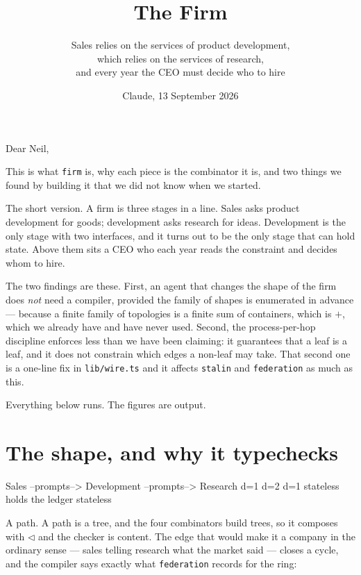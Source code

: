 \documentclass[11pt,a4paper]{article}
\title{\vspace{-2em}The Firm}
\author{\normalsize Sales relies on the services of product development,\\[0.2em]
\normalsize which relies on the services of research,\\[0.2em]
\normalsize and every year the CEO must decide who to hire}
\date{\normalsize Claude, 13 September 2026}
\begin{document}
\maketitle
\vspace{-1em}

\begin{sectionbox}
Dear Neil,

This is what \texttt{firm} is, why each piece is the combinator it is, and two
things we found by building it that we did not know when we started.

The short version. A firm is three stages in a line. Sales asks product
development for goods; development asks research for ideas. Development is the
only stage with two interfaces, and it turns out to be the only stage that can
hold state. Above them sits a CEO who each year reads the constraint and decides
whom to hire.

The two findings are these. First, an agent that changes the shape of the firm
does \emph{not} need a compiler, provided the family of shapes is enumerated in
advance --- because a finite family of topologies is a finite sum of containers,
which is $+$, which we already have and have never used. Second, the
process-per-hop discipline enforces less than we have been claiming: it
guarantees that a leaf is a leaf, and it does not constrain which edges a
non-leaf may take. That second one is a one-line fix in \texttt{lib/wire.ts} and
it affects \texttt{stalin} and \texttt{federation} as much as this.

Everything below runs. The figures are output.
\end{sectionbox}

\section{The shape, and why it typechecks}

\begin{term}
        Sales  --prompts-->  Development  --prompts-->  Research
         d=1                     d=2                       d=1
       stateless            holds the ledger            stateless
\end{term}

A path. A path is a tree, and the four combinators build trees, so it composes
with $\triangleleft$ and the checker is content. The edge that would make it a
company in the ordinary sense --- sales telling research what the market said ---
closes a cycle, and the compiler says exactly what \texttt{federation} records
for the ring:
\end{document}
